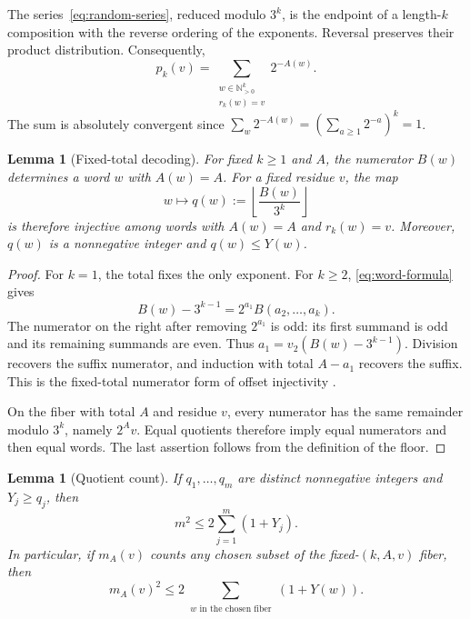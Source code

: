 \documentclass[11pt]{article}
\newtheorem{lemma}[theorem]{Lemma}
\theoremstyle{remark}
\begin{document}
The series~\eqref{eq:random-series}, reduced modulo \(3^k\), is the
endpoint of a length-\(k\) composition with the reverse ordering of
the exponents.  Reversal preserves their product distribution.
Consequently,
\begin{equation}\label{eq:fair-words}
  p_k(v)=\sum_{\substack{w\in\mathbb N_{>0}^k\\r_k(w)=v}}2^{-A(w)}.
\end{equation}
The sum is absolutely convergent since
\(\sum_w2^{-A(w)}=(\sum_{a\geq1}2^{-a})^k=1\).

\begin{lemma}[Fixed-total decoding]\label{lem:decoding}
For fixed \(k\geq1\) and \(A\), the numerator \(B(w)\)
determines a word \(w\) with \(A(w)=A\).  For a fixed residue
\(v\), the map
\[
  w\longmapsto q(w):=\left\lfloor\frac{B(w)}{3^k}\right\rfloor
\]
is therefore injective among words with \(A(w)=A\) and \(r_k(w)=v\).
Moreover, \(q(w)\) is a nonnegative integer and \(q(w)\leq Y(w)\).
\end{lemma}

\begin{proof}
For \(k=1\), the total fixes the only exponent.  For \(k\geq2\),
\eqref{eq:word-formula} gives
\[
  B(w)-3^{k-1}=2^{a_1}B(a_2,\ldots,a_k).
\]
The numerator on the right after removing \(2^{a_1}\) is odd:
its first summand is odd and its remaining summands are even.
Thus
\(a_1=v_2(B(w)-3^{k-1})\).  Division recovers the suffix
numerator, and induction with total \(A-a_1\) recovers the suffix.
This is the fixed-total numerator form of offset injectivity
\cite[Lemma~6.2]{Tao}.

On the fiber with total \(A\) and residue \(v\), every numerator
has the same remainder modulo \(3^k\), namely \(2^A v\).
Equal quotients therefore imply equal numerators and then equal words.
The last assertion follows from the definition of the floor.
\end{proof}

\begin{lemma}[Quotient count]\label{lem:quotient-count}
If \(q_1,\ldots,q_m\) are distinct nonnegative integers and
\(Y_j\geq q_j\), then
\[
  m^2\leq2\sum_{j=1}^m(1+Y_j).
\]
In particular, if \(m_A(v)\) counts any chosen subset of the
fixed-\((k,A,v)\) fiber, then
\begin{equation}\label{eq:fiber-count}
  m_A(v)^2\leq
  2\sum_{\substack{w\text{ in the chosen fiber}}}(1+Y(w)).
\end{equation}
\end{lemma}
\end{document}
